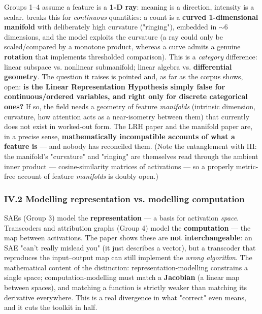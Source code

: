 Groups 1--4 assume a feature is a \textbf{1-D ray}: meaning is a direction, intensity is a scalar. \textcite{when-models-manipulate-manifolds-counting} breaks this for \emph{continuous} quantities: a count is a \textbf{curved 1-dimensional manifold} with deliberately high curvature ("ringing"), embedded in $\sim$6 dimensions, and the model exploits the curvature (a ray could only be scaled/compared by a monotone product, whereas a curve admits a genuine \textbf{rotation} that implements thresholded comparison). This is a \emph{category} difference: linear subspace vs. nonlinear submanifold; linear algebra vs. \textbf{differential geometry}. The question it raises is pointed and, as far as the corpus shows, open: \textbf{is the Linear Representation Hypothesis simply false for continuous/ordered variables, and right only for discrete categorical ones?} If so, the field needs a geometry of feature \emph{manifolds} (intrinsic dimension, curvature, how attention acts as a near-isometry between them) that currently does not exist in worked-out form. The LRH paper and the manifold paper are, in a precise sense, \textbf{mathematically incompatible accounts of what a feature is} --- and nobody has reconciled them. (Note the entanglement with III: the manifold's "curvature" and "ringing" are themselves read through the ambient inner product --- cosine-similarity matrices of activations --- so a properly metric-free account of feature \emph{manifolds} is doubly open.)


\subsubsection*{IV.2 Modelling representation vs. modelling computation}

SAEs (Group 3) model the \textbf{representation} --- a basis for activation \emph{space}. Transcoders and attribution graphs (Group 4) model the \textbf{computation} --- the map between activations. The \textcite{toy-model-of-mechanistic-unfaithfulness} paper shows these are \textbf{not interchangeable}: an SAE "can't really mislead you" (it just describes a vector), but a transcoder that reproduces the input--output map can still implement the \emph{wrong algorithm}. The mathematical content of the distinction: representation-modelling constrains a single space; computation-modelling must match a \textbf{Jacobian} (a linear map between spaces), and matching a function is strictly weaker than matching its derivative everywhere. This is a real divergence in what "correct" even means, and it cuts the toolkit in half.


